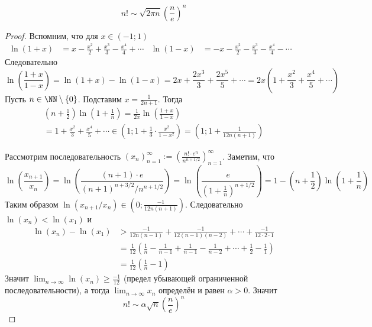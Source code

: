 \documentclass[12pt,a4paper]{article}
\begin{document}
    \begin{theorem}
        \[n! \sim \sqrt{2\pi n} \left(\frac{n}{e}\right)^n\]
    \end{theorem}

    \begin{proof}
        Вспомним, что для $x \in (-1; 1)$
        \begin{align*}
            \ln(1+x) &= x - \frac{x^2}{2} + \frac{x^3}{3} - \frac{x^4}{4} + \cdots&
            \ln(1-x) &= -x - \frac{x^2}{2} - \frac{x^3}{3} - \frac{x^4}{4} - \cdots&
        \end{align*}
        Следовательно
        \[
            \ln\left(\frac{1+x}{1-x}\right)
            = \ln(1+x) - \ln(1-x) = 2x + \frac{2x^3}{3} + \frac{2x^5}{5} + \cdots
            = 2x \left(1 + \frac{x^2}{3} + \frac{x^4}{5} + \cdots \right)
        \]
        Пусть $n \in \NN \setminus \{0\}$. Подставим $x = \frac{1}{2n+1}$. Тогда
        \begin{multline*}
            \left(n + \frac{1}{2}\right)\ln\left(1 + \frac{1}{n}\right)
            = \frac{1}{2x} \ln\left(\frac{1+x}{1-x}\right)\\
            = 1 + \frac{x^2}{3} + \frac{x^4}{5} + \cdots
            \in \left(1; 1 + \frac{1}{3} \cdot \frac{x^2}{1 - x^2}\right)
            = \left(1; 1 + \frac{1}{12n(n+1)}\right)
        \end{multline*}

        Рассмотрим последовательность $(x_n)_{n=1}^\infty := \left(\frac{n! \cdot e^n}{n^{n+1/2}}\right)_{n=1}^\infty$. Заметим, что
        \[
            \ln\left(\frac{x_{n+1}}{x_n}\right)
            = \ln\left(\frac{(n+1) \cdot e}{(n+1)^{n+3/2} / n^{n+1/2}}\right)
            = \ln\left(\frac{e}{(1 + \frac{1}{n})^{n + 1/2}}\right)
            = 1 - \left(n + \frac{1}{2}\right)\ln\left(1 + \frac{1}{n}\right)
        \]
        Таким образом $\ln(x_{n+1}/x_n) \in (0; \frac{-1}{12n(n+1)})$. Следовательно $\ln(x_n) < \ln(x_1)$ и
        \begin{align*}
            \ln(x_n) - \ln(x_1)
            &> \frac{-1}{12n(n-1)} + \frac{-1}{12(n-1)(n-2)} + \cdots + \frac{-1}{12\cdot 2 \cdot 1}\\
            &= \frac{1}{12}\left(\frac{1}{n} - \frac{1}{n-1} + \frac{1}{n-1} - \frac{1}{n-2} + \cdots + \frac{1}{2} - \frac{1}{1}\right)\\
            &= \frac{1}{12}\left(\frac{1}{n} - 1\right)
        \end{align*}
        Значит $\lim_{n \to \infty} \ln(x_n) \geqslant \frac{-1}{12}$ (предел убывающей ограниченной последовательности), а тогда $\lim_{n \to \infty} x_n$ определён и равен $\alpha > 0$. Значит
        \[n! \sim \alpha \sqrt{n} \left(\frac{n}{e}\right)^n\]


\end{proof}
\end{document}
